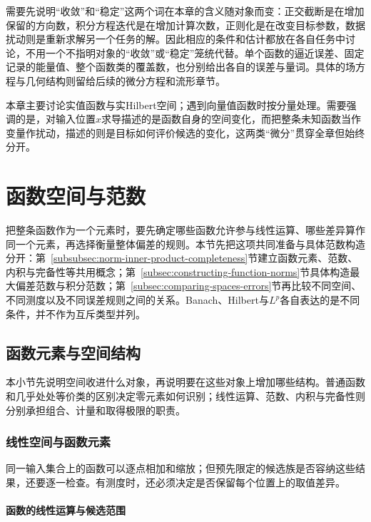 需要先说明“收敛”和“稳定”这两个词在本章的含义随对象而变：正交截断是在增加保留的方向数，积分方程迭代是在增加计算次数，正则化是在改变目标参数，数据扰动则是重新求解另一个任务的解。因此相应的条件和估计都放在各自任务中讨论，不用一个不指明对象的“收敛”或“稳定”笼统代替。单个函数的逼近误差、固定记录的能量值、整个函数类的覆盖数，也分别给出各自的误差与量词。具体的场方程与几何结构则留给后续的微分方程和流形章节。

本章主要讨论实值函数与实Hilbert空间；遇到向量值函数时按分量处理。需要强调的是，对输入位置$x$求导描述的是函数自身的空间变化，而把整条未知函数当作变量作扰动，描述的则是目标如何评价候选的变化，这两类“微分”贯穿全章但始终分开。

\section{函数空间与范数}
\label{sec:function-spaces-and-norms}

把整条函数作为一个元素时，要先确定哪些函数允许参与线性运算、哪些差异算作同一个元素，再选择衡量整体偏差的规则。本节先把这项共同准备与具体范数构造分开：第~\ref{subsubsec:norm-inner-product-completeness}节建立函数元素、范数、内积与完备性等共用概念；第~\ref{subsec:constructing-function-norms}节具体构造最大偏差范数与积分范数；第~\ref{subsec:comparing-spaces-errors}节再比较不同空间、不同测度以及不同误差规则之间的关系。Banach、Hilbert与$L^p$各自表达的是不同条件，并不作为互斥类型并列。

\subsection{函数元素与空间结构}
\label{subsec:function-elements-structure}

本小节先说明空间收进什么对象，再说明要在这些对象上增加哪些结构。普通函数和几乎处处等价类的区别决定零元素如何识别；线性运算、范数、内积与完备性则分别承担组合、计量和取得极限的职责。

\subsubsection{线性空间与函数元素}
\label{subsubsec:linear-function-candidates}

同一输入集合上的函数可以逐点相加和缩放；但预先限定的候选族是否容纳这些结果，还要逐一检查。有测度时，还必须决定是否保留每个位置上的取值差异。

\paragraph{函数的线性运算与候选范围}

